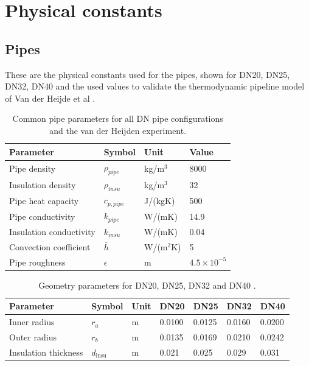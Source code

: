 \chapter{Physical constants}\label{chap::constants}

\section{Pipes}
These are the physical constants used for the pipes, shown for DN20, DN25, DN32, DN40 and the used values to validate the thermodynamic pipeline model of Van der Heijde et al \cite{VANDERHEIJDE2017158}. 

\begin{table}[h!]
\centering
\caption{Common pipe parameters for all DN pipe configurations and the van der Heijden experiment.}
\label{tab:pipe_dn_common}
\begin{tabular}{llll}
\hline
\textbf{Parameter} & \textbf{Symbol} & \textbf{Unit} & \textbf{Value} \\
\hline
Pipe density            & $\rho_{pipe}$   & kg/m$^3$          & 8000                 \\
Insulation density      & $\rho_{insu}$   & kg/m$^3$          & 32                   \\
Pipe heat capacity      & $c_{p,pipe}$    & J/(kgK)           & 500                  \\
Pipe conductivity       & $k_{pipe}$      & W/(mK)            & 14.9                 \\
Insulation conductivity & $k_{insu}$      & W/(mK)            & 0.04                 \\
Convection coefficient  & $\bar{h}$       & W/(m$^2$K)        & 5                    \\
Pipe roughness          & $\epsilon$      & m                 & $4.5 \times 10^{-5}$ \\
\hline
\end{tabular}
\end{table}

\begin{table}[h!]
\centering
\caption{Geometry parameters for DN20, DN25, DN32 and DN40 \cite{VIB2025}.}
\label{tab:pipe_dn_geometry}
\begin{tabular}{lllllll}
\hline
\textbf{Parameter} & \textbf{Symbol} & \textbf{Unit} & \textbf{DN20} & \textbf{DN25} & \textbf{DN32} & \textbf{DN40} \\
\hline
Inner radius         & $r_a$  & m & 0.0100 & 0.0125 & 0.0160 & 0.0200 \\
Outer radius         & $r_b$  & m & 0.0135 & 0.0169 & 0.0210 & 0.0242 \\
Insulation thickness & $d_{\text{insu}}$     & m & 0.021  & 0.025  & 0.029  & 0.031  \\
\hline
\end{tabular}
\end{table}

